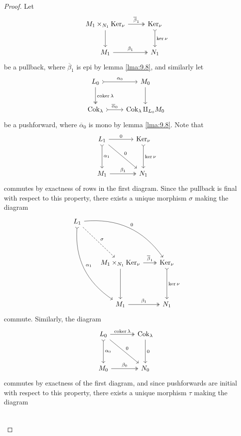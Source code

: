 \begin{proof}
	Let
	\[\begin{tikzcd}[row sep = 2.5em, column sep = 2.5em]
		M_1\times_{N_1} \operatorname{Ker} _\nu \arrow[r, two heads, " \overline{\beta}_1 "]\arrow[d]&\operatorname{Ker} _\nu \arrow[d, tail, "\ker \nu "]\\
		M_1\arrow[r, two heads, "\beta _1"]&N_1
	\end{tikzcd}\]
	be a pullback, where $\overline{\beta } _1$ is epi by lemma \ref{lma:9.8}, and similarly let
	\[\begin{tikzcd}[row sep = 2.5em, column sep = 2.5em]
		L_0\arrow[r, tail, "\alpha _0"]\arrow[d, two heads, "\coker \lambda "]&M_0\arrow[d]\\
		\operatorname{Cok} _\lambda \arrow[r, tail, " \overline{\alpha } _0"]&\operatorname{Cok} _\lambda \amalg_{L_0} M_0
	\end{tikzcd}\]
	be a pushforward, where $\overline{\alpha } _0$ is mono by lemma \ref{lma:9.8}. Note that
	\[\begin{tikzcd}[row sep = 3.5em, column sep = 3.5em]
		L_1\arrow[r, "0"]\arrow[dr, "0"]\arrow[d, tail, "\alpha _1"]&\operatorname{Ker} _\nu \arrow[d, tail, "\ker \nu "]\\
		M_1\arrow[r, two heads, "\beta _1"]&N_1
	\end{tikzcd}\]
	commutes by exactness of rows in the first diagram. Since the pullback is final with respect to this property, there exists a unique morphism $\sigma$ making the diagram
	\[\begin{tikzcd}[row sep = 4.5em, column sep = 2em]
		L_1\arrow[dr, dashed, "\sigma "]\arrow[ddr, tail, bend right, "\alpha _1"]\arrow[drr, bend left, "0"]\\
		&M_1\times _{N_1} \operatorname{Ker} _\nu \arrow[r, two heads, " \overline{\beta }_1"]\arrow[d]&\operatorname{Ker} _\nu\arrow[d, tail, "\ker \nu "] \\
		&M_1\arrow[r, two heads, "\beta _1"]&N_1
	\end{tikzcd}\]
	commute. Similarly, the diagram
	\[\begin{tikzcd}[row sep = 3.5em, column sep = 3.5em]
		L_0\arrow[r, two heads, "\coker \lambda "]\arrow[d, tail, "\alpha _0"]\arrow[dr, "0"]&\operatorname{Cok} _\lambda \arrow[d, "0"]\\
		M_0\arrow[r, two heads, "\beta _0"]&N_0
	\end{tikzcd}\]
	commutes by exactness of the first diagram, and since pushforwards are initial with respect to this property, there exists a unique morphism $\tau $ making the diagram
	\[\begin{tikzcd}[row sep = 4.5em, column sep = 2em]

\end{tikzcd}\]
\end{proof}
